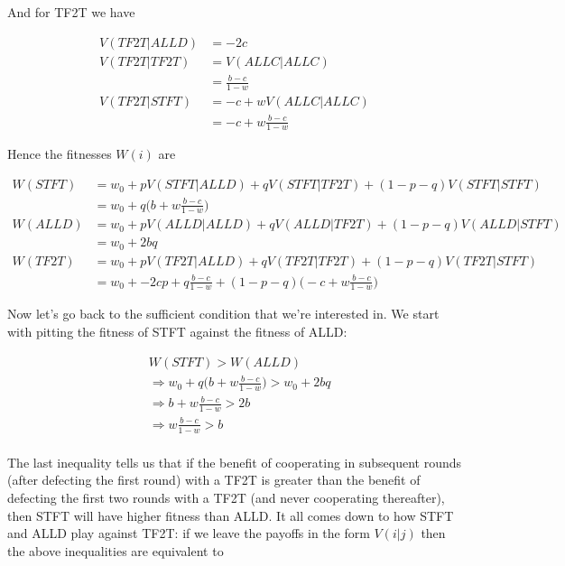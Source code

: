 \documentclass{article}
\begin{document}
And for TF2T we have

\begin{align*}
    V(TF2T|ALLD) &= - 2 c \\
    V(TF2T|TF2T) &= V(ALLC|ALLC) \\
                 &= \frac{b - c}{1 - w} \\
    V(TF2T|STFT) &= - c + w V(ALLC|ALLC) \\
                 &= - c + w \frac{b - c}{1 - w}
\end{align*}

Hence the fitnesses $W(i)$ are

\begin{align*}
    W(STFT) &= w_0 + p V(STFT|ALLD) + q V(STFT|TF2T) + (1 - p - q) V(STFT|STFT) \\
            &= w_0 + q \Big(b + w \frac{b - c}{1 - w}\Big) \\
    W(ALLD) &= w_0 + p V(ALLD|ALLD) + q V(ALLD|TF2T) + (1 - p - q) V(ALLD|STFT) \\
            &= w_0 + 2 b q \\
    W(TF2T) &= w_0 + p V(TF2T|ALLD) + q V(TF2T|TF2T) + (1 - p - q) V(TF2T|STFT) \\
            &= w_0 + - 2 c p + q \frac{b - c}{1 - w} + (1 - p - q) \Big(- c + w \frac{b - c}{1 - w}\Big)
\end{align*}

Now let's go back to the sufficient condition that we're interested in.
We start with pitting the fitness of STFT against the fitness of ALLD:

\begin{align*}
    &W(STFT) > W(ALLD) \\
    &\Rightarrow w_0 + q \Big(b + w \frac{b - c}{1 - w}\Big) > w_0 + 2 b q \\
    &\Rightarrow b + w \frac{b - c}{1 - w} > 2 b \\
    &\Rightarrow w \frac{b - c}{1 - w} > b \\
\end{align*}

The last inequality tells us that if the benefit of cooperating in
subsequent rounds (after defecting the first round) with a TF2T is
greater than the benefit of defecting the first two rounds with a TF2T
(and never cooperating thereafter), then STFT will have higher fitness
than ALLD. It all comes down to how STFT and ALLD play against TF2T: if
we leave the payoffs in the form $V(i|j)$ then the above inequalities
are equivalent to
\end{document}
